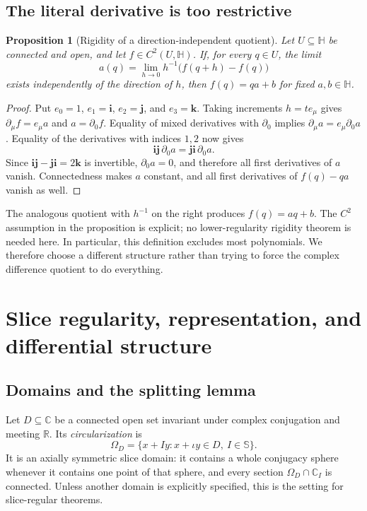 \documentclass[11pt,a4paper]{article}
\numberwithin{equation}{section}
\newtheorem{proposition}[theorem]{Proposition}
\theoremstyle{definition}
\theoremstyle{remark}
\newcommand{\R}{\mathbb R}
\newcommand{\C}{\mathbb C}
\newcommand{\HH}{\mathbb H}
\newcommand{\SSS}{\mathbb S}
\newcommand{\ii}{\mathbf i}
\newcommand{\jj}{\mathbf j}
\newcommand{\kk}{\mathbf k}
\begin{document}
\subsection{The literal derivative is too restrictive}
\begin{proposition}[Rigidity of a direction-independent quotient]
\label{prop:rigidity}
Let $U\subseteq\HH$ be connected and open, and let $f\in C^2(U,\HH)$.
If, for every $q\in U$, the limit
\[
 a(q)=\lim_{h\to0}h^{-1}\bigl(f(q+h)-f(q)\bigr)
\]
exists independently of the direction of $h$, then $f(q)=q a+b$ for fixed
$a,b\in\HH$.
\end{proposition}
\begin{proof}
Put $e_0=1$, $e_1=\ii$, $e_2=\jj$, and $e_3=\kk$.
Taking increments $h=t e_\mu$ gives
$\partial_\mu f=e_\mu a$ and $a=\partial_0 f$.
Equality of mixed derivatives with $\partial_0$ implies
$\partial_\mu a=e_\mu\partial_0 a$. Equality of the derivatives with indices
$1,2$ now gives
\[
 \ii\jj\,\partial_0a=\jj\ii\,\partial_0a.
\]
Since $\ii\jj-\jj\ii=2\kk$ is invertible, $\partial_0a=0$, and therefore all
first derivatives of $a$ vanish. Connectedness makes $a$ constant, and all
first derivatives of $f(q)-qa$ vanish as well.
\end{proof}
The analogous quotient with $h^{-1}$ on the right produces $f(q)=aq+b$.
The $C^2$ assumption in the proposition is explicit; no lower-regularity
rigidity theorem is needed here. In particular, this definition excludes most
polynomials. We therefore choose a different structure rather than trying to
force the complex difference quotient to do everything.

\section{Slice regularity, representation, and differential structure}
\label{sec:slices}
\subsection{Domains and the splitting lemma}
Let $D\subseteq\C$ be a connected open set invariant under complex conjugation
and meeting $\R$. Its \emph{circularization} is
\[
 \Omega_D=\{x+Iy:x+\iota y\in D,\ I\in\SSS\}.
\]
It is an axially symmetric slice domain: it contains a whole conjugacy sphere
whenever it contains one point of that sphere, and every section
$\Omega_D\cap\C_I$ is connected. Unless another domain is explicitly specified,
this is the setting for slice-regular theorems.
\end{document}

